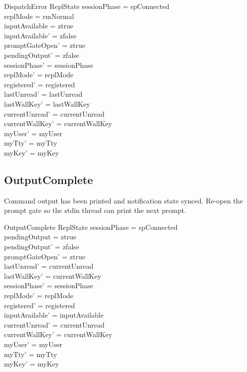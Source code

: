 \documentclass[a4paper,10pt,fleqn]{article}
\begin{document}
\begin{schema}{DispatchError}
  \Delta ReplState
\where
  sessionPhase = spConnected \\
  replMode = rmNormal \\
  inputAvailable = ztrue \\
  inputAvailable' = zfalse \\
  promptGateOpen' = ztrue \\
  pendingOutput' = zfalse \\
  sessionPhase' = sessionPhase \\
  replMode' = replMode \\
  registered' = registered \\
  lastUnread' = lastUnread \\
  lastWallKey' = lastWallKey \\
  currentUnread' = currentUnread \\
  currentWallKey' = currentWallKey \\
  myUser' = myUser \\
  myTty' = myTty \\
  myKey' = myKey
\end{schema}

\subsection{OutputComplete}

Command output has been printed and notification state synced.
Re-open the prompt gate so the stdin thread can print the next
prompt.

\begin{schema}{OutputComplete}
  \Delta ReplState
\where
  sessionPhase = spConnected \\
  pendingOutput = ztrue \\
  pendingOutput' = zfalse \\
  promptGateOpen' = ztrue \\
  lastUnread' = currentUnread \\
  lastWallKey' = currentWallKey \\
  sessionPhase' = sessionPhase \\
  replMode' = replMode \\
  registered' = registered \\
  inputAvailable' = inputAvailable \\
  currentUnread' = currentUnread \\
  currentWallKey' = currentWallKey \\
  myUser' = myUser \\
  myTty' = myTty \\
  myKey' = myKey
\end{schema}
\end{document}
